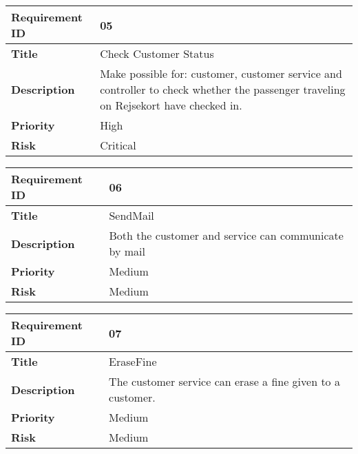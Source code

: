 \begin{center}
	\def\arraystretch{1.5}%
    \begin{tabular}{ | p{5cm} | p{5cm} |}
    \hline
    	\textbf{Requirement ID} & 05 \\ \hline
		\textbf{Title} & Check Customer Status\\ \hline
		\textbf{Description} & Make possible for: customer, customer service and controller to check whether the passenger traveling on Rejsekort have checked in.\\ \hline
		\textbf{Priority} & High\\ \hline
		\textbf{Risk} & Critical\\
      \hline
    \end{tabular}
\end{center}

\begin{center}
	\def\arraystretch{1.5}%
    \begin{tabular}{ | p{5cm} | p{5cm} |}
    \hline
    	\textbf{Requirement ID} & 06 \\ \hline
		\textbf{Title} & SendMail\\ \hline
		\textbf{Description} & Both the customer and service can communicate by mail\\ \hline
		\textbf{Priority} & Medium\\ \hline
		\textbf{Risk} & Medium\\
      \hline
    \end{tabular}
\end{center}

\begin{center}
	\def\arraystretch{1.5}%
    \begin{tabular}{ | p{5cm} | p{5cm} |}
    \hline
    	\textbf{Requirement ID} & 07 \\ \hline
		\textbf{Title} & EraseFine\\ \hline
		\textbf{Description} & The customer service can erase a fine given to a customer.\\ \hline
		\textbf{Priority} & Medium\\ \hline
		\textbf{Risk} & Medium\\
      \hline
    \end{tabular}
\end{center}

